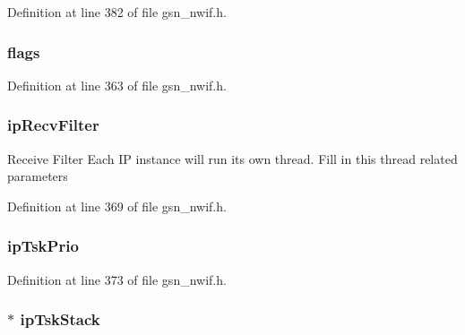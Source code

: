 Definition at line 382 of file gsn\_\-nwif.h.

\hypertarget{a00169_a4767d0f6570f98849cacbfa9a18ab612}{
\subsubsection[{flags}]{ {\bf flags}}}
\label{a00169_a4767d0f6570f98849cacbfa9a18ab612}


Definition at line 363 of file gsn\_\-nwif.h.

\hypertarget{a00169_ab32f7d6fb4fbd0d87bb049ea5f1e07fa}{
\subsubsection[{ipRecvFilter}]{ {\bf ipRecvFilter}}}
\label{a00169_ab32f7d6fb4fbd0d87bb049ea5f1e07fa}
Receive Filter Each IP instance will run its own thread. Fill in this thread related parameters 

Definition at line 369 of file gsn\_\-nwif.h.

\hypertarget{a00169_a003165255dc4d674fa820b252cede443}{
\subsubsection[{ipTskPrio}]{ {\bf ipTskPrio}}}
\label{a00169_a003165255dc4d674fa820b252cede443}


Definition at line 373 of file gsn\_\-nwif.h.

\hypertarget{a00169_add3f3ec534fd1f44097468966f12316e}{
\subsubsection[{ipTskStack}]{$\ast$ {\bf ipTskStack}}}
\label{a00169_add3f3ec534fd1f44097468966f12316e}


